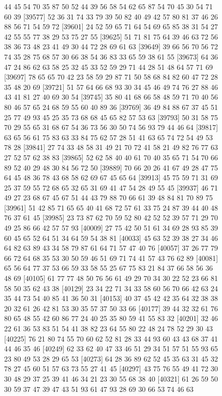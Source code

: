 \documentclass{article}
\begin{document}
\begin{figure}[H]
\begin{Schunk}
\begin{Soutput}
[39553] 44 45 54 70 35 87 50 52 44 39 56 58 54 62 65 87 54 70 45 30 54 71 60 39
[39577] 52 36 31 74 33 79 39 50 82 40 49 42 57 80 81 37 46 26 88 56 71 54 59 72
[39601] 24 52 59 65 71 64 54 69 65 85 38 31 54 27 42 55 55 77 38 29 53 75 27 55
[39625] 51 71 81 75 64 39 46 63 72 56 38 36 73 48 23 41 49 30 44 72 28 69 61 63
[39649] 39 66 56 70 56 72 74 35 28 75 68 57 30 66 38 54 36 83 33 65 59 38 61 55
[39673] 64 36 47 24 86 62 63 58 25 32 45 33 52 59 29 71 44 28 51 48 64 57 71 69
[39697] 78 65 65 70 42 23 58 59 29 87 71 50 58 68 84 82 60 47 72 28 35 48 20 69
[39721] 51 57 64 66 68 93 30 34 45 46 49 74 76 27 88 46 43 41 81 27 40 69 30 54
[39745] 35 80 41 68 66 58 48 59 71 70 40 56 80 46 57 65 24 68 59 55 60 40 89 36
[39769] 36 49 84 88 67 37 45 51 25 77 49 93 45 25 35 73 68 68 45 65 82 57 53 63
[39793] 50 31 58 75 70 29 55 65 31 68 67 54 36 73 56 30 50 74 56 93 79 44 46 64
[39817] 63 65 56 61 75 83 63 33 84 75 62 57 28 51 41 63 65 74 72 54 49 53 78 28
[39841] 27 74 33 48 58 31 49 21 70 72 41 58 21 49 82 76 77 63 27 52 57 62 38 83
[39865] 52 62 58 40 40 61 70 40 35 65 71 54 70 66 89 52 40 29 48 30 84 56 72 50
[39889] 70 66 20 26 41 67 49 28 47 75 64 45 48 36 78 43 68 58 62 69 67 45 65 64
[39913] 45 75 59 71 31 69 25 37 59 55 72 68 65 32 65 31 69 41 47 54 28 49 55 45
[39937] 46 71 49 27 23 68 67 45 67 51 44 43 79 88 70 66 61 39 48 84 81 70 89 75
[39961] 51 42 85 71 65 65 40 41 68 72 57 61 33 75 24 87 39 44 40 48 76 37 61 45
[39985] 23 73 87 62 70 59 52 80 42 52 52 39 57 71 29 70 49 25 86 66 42 57 57 93
[40009] 27 75 42 50 51 61 34 69 28 93 85 39 60 45 65 52 64 51 34 64 59 54 38 81
[40033] 45 63 52 39 38 27 34 46 64 82 63 89 43 34 58 79 87 61 64 71 57 47 40 76
[40057] 37 26 77 79 66 72 64 68 35 53 30 50 59 46 51 69 71 74 41 57 43 76 62 89
[40081] 65 56 64 77 37 53 66 59 33 58 55 25 67 75 83 21 84 37 66 58 56 36 48 69
[40105] 61 77 77 48 50 76 56 61 49 29 70 34 30 22 52 23 66 81 58 50 35 62 43 38
[40129] 23 34 22 71 34 33 58 60 56 70 66 42 63 24 35 44 73 54 40 85 41 36 50 31
[40153] 40 37 45 42 42 35 64 32 38 38 20 32 61 26 42 81 53 30 35 57 37 50 33 66
[40177] 39 44 32 32 61 76 80 65 48 55 42 60 86 77 24 40 25 35 80 59 41 55 83 32
[40201] 32 46 22 61 36 53 83 51 54 41 38 82 23 64 55 80 22 48 24 78 52 29 30 43
[40225] 76 21 80 74 55 70 60 62 52 81 28 33 44 93 60 43 43 68 37 41 44 46 35 46
[40249] 62 33 62 40 47 33 46 51 29 34 51 57 51 55 93 65 23 80 49 53 28 29 65 53
[40273] 64 28 36 89 62 52 45 35 63 31 45 32 78 27 45 60 51 57 63 73 55 27 41 45
[40297] 43 75 76 55 49 41 72 30 30 48 29 37 25 39 41 46 34 21 23 30 55 68 38 40
[40321] 61 26 59 50 30 59 37 47 39 47 43 51 93 61 47 93 28 69 30 66 53 74 46 63

\end{Soutput}
\end{Schunk}
\end{figure}
\end{document}
